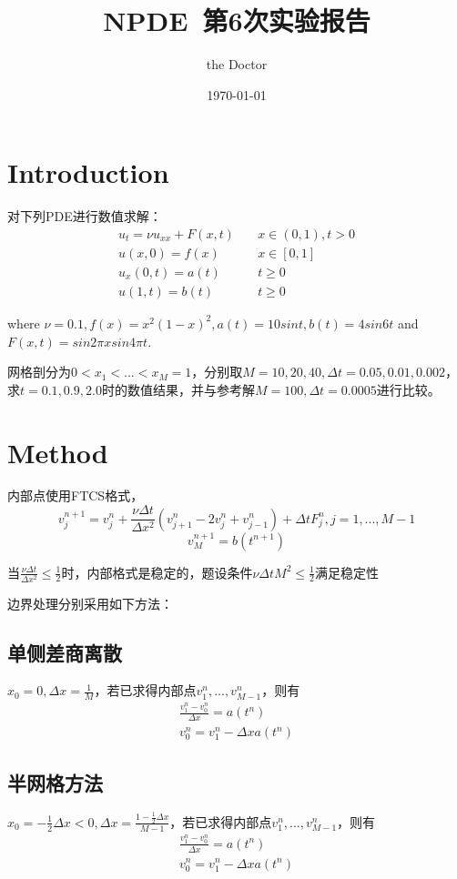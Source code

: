 \documentclass{article}
\title{NPDE~第6次实验报告}
\author{the Doctor}
\date{\today}
\begin{document}
\maketitle

\section{Introduction}
对下列PDE进行数值求解：
\begin{equation*}
    \begin{aligned}
        u_t=\nu u_{xx}+F(x,t)&\quad x\in (0,1),t>0\\
        u(x,0)=f(x)&\quad x\in [0,1]\\
        u_x(0,t)=a(t)&\quad t\geq 0\\
        u(1,t)=b(t)&\quad t\geq 0
    \end{aligned}
\end{equation*}

where $\nu = 0.1, f(x) = x^2(1 - x)^2, a(t) = 10 sin t, b(t) = 4sin 6t$ and $ F(x, t) =
sin 2\pi x sin 4\pi t$.

网格剖分为$0<x_1<...<x_M=1$，分别取$M=10,20,40,\Delta t=0.05,0.01,0.002$，求$t=0.1,0.9,2.0$时的数值结果，并与参考解$M=100,\Delta t=0.0005$进行比较。
\section{Method}
内部点使用FTCS格式，
$$v_{j}^{n+1} = v_{j}^{n} + \frac{\nu \Delta t}{\Delta x^2}(v_{j+1}^{n} - 2v_{j}^{n} + v_{j-1}^{n}) + \Delta t F_{j}^{n}, j=1,...,M-1$$
$$v_M^{n+1} = b(t^{n+1})$$

当$\frac{\nu\Delta t}{\Delta x^2}\leq \frac{1}{2}$时，内部格式是稳定的，题设条件$\nu\Delta t M^2\leq \frac{1}{2}$满足稳定性

边界处理分别采用如下方法：
\subsection{单侧差商离散}
$x_0=0, \Delta x=\frac{1}{M}$，若已求得内部点$v_1^n,...,v_{M-1}^n$，则有
\begin{equation*}
    \begin{aligned}
        \frac{v_1^n-v_0^n}{\Delta x}=a(t^n)\\
        v_0^n=v_1^n-\Delta x a(t^n)
    \end{aligned}
\end{equation*}
\subsection{半网格方法}
$x_0=-\frac{1}{2}\Delta x<0, \Delta x=\frac{1-\frac{1}{2}\Delta x}{M-1}$，若已求得内部点$v_1^n,...,v_{M-1}^n$，则有
\begin{equation*}
    \begin{aligned}
        \frac{v_1^n-v_0^n}{\Delta x}=a(t^n)\\
        v_0^n=v_1^n-\Delta x a(t^n)
    \end{aligned}
\end{equation*}
\end{document}
